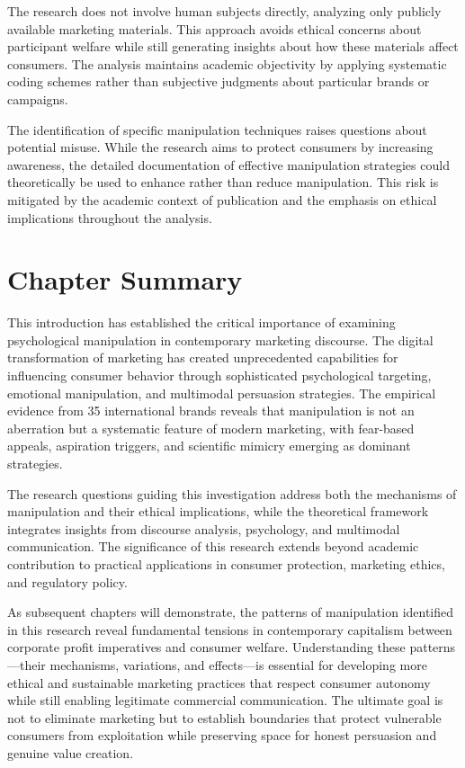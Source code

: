 The research does not involve human subjects directly, analyzing only publicly available marketing materials. This approach avoids ethical concerns about participant welfare while still generating insights about how these materials affect consumers. The analysis maintains academic objectivity by applying systematic coding schemes rather than subjective judgments about particular brands or campaigns.

The identification of specific manipulation techniques raises questions about potential misuse. While the research aims to protect consumers by increasing awareness, the detailed documentation of effective manipulation strategies could theoretically be used to enhance rather than reduce manipulation. This risk is mitigated by the academic context of publication and the emphasis on ethical implications throughout the analysis.

\section{Chapter Summary}
\label{sec:chapter_summary}

This introduction has established the critical importance of examining psychological manipulation in contemporary marketing discourse. The digital transformation of marketing has created unprecedented capabilities for influencing consumer behavior through sophisticated psychological targeting, emotional manipulation, and multimodal persuasion strategies. The empirical evidence from 35 international brands reveals that manipulation is not an aberration but a systematic feature of modern marketing, with fear-based appeals, aspiration triggers, and scientific mimicry emerging as dominant strategies.

The research questions guiding this investigation address both the mechanisms of manipulation and their ethical implications, while the theoretical framework integrates insights from discourse analysis, psychology, and multimodal communication. The significance of this research extends beyond academic contribution to practical applications in consumer protection, marketing ethics, and regulatory policy.

As subsequent chapters will demonstrate, the patterns of manipulation identified in this research reveal fundamental tensions in contemporary capitalism between corporate profit imperatives and consumer welfare. Understanding these patterns—their mechanisms, variations, and effects—is essential for developing more ethical and sustainable marketing practices that respect consumer autonomy while still enabling legitimate commercial communication. The ultimate goal is not to eliminate marketing but to establish boundaries that protect vulnerable consumers from exploitation while preserving space for honest persuasion and genuine value creation.